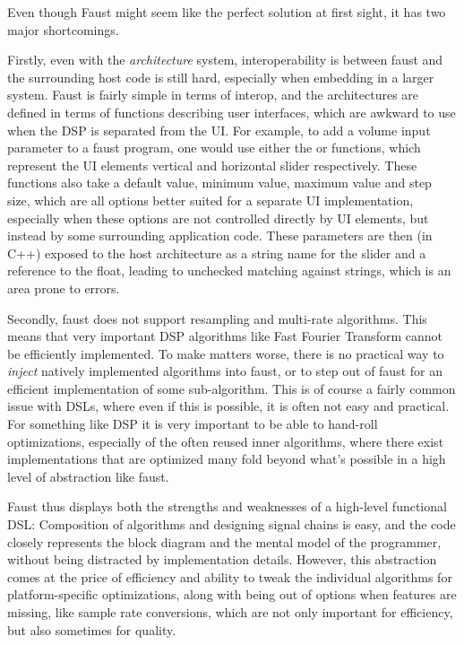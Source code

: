 Even though Faust might seem like the perfect solution at first sight, it has two major shortcomings.

Firstly, even with the \emph{architecture} system, interoperability is between faust and the surrounding
host code is still hard, especially when embedding in a larger system. Faust is fairly simple in terms of
interop, and the architectures are defined in terms of functions describing user interfaces, which are
awkward to use when the DSP is separated from the UI. For example, to add a volume input parameter to a faust
program, one would use either the  or  functions, which represent the UI elements
vertical and horizontal slider respectively. These functions also take a default value, minimum value,
maximum value and step size, which are all options better suited for a separate UI implementation, especially
when these options are not controlled directly by UI elements, but instead by some surrounding application
code. These parameters are then (in C++) exposed to the host architecture as a string name for the slider and
a reference to the float, leading to unchecked matching against strings, which is an area prone to errors.

Secondly, faust does not support resampling and multi-rate algorithms. This means that very important DSP
algorithms like Fast Fourier Transform cannot be efficiently implemented. To make matters worse, there is no
practical way to \emph{inject} natively implemented algorithms into faust, or to step out of faust
for an efficient implementation of some sub-algorithm. This is of course a fairly common issue with DSLs,
where even if this is possible, it is often not easy and practical. For something like DSP it is very
important to be able to hand-roll optimizations, especially of the often reused inner algorithms, where there
exist implementations that are optimized many fold beyond what's possible in a high level of abstraction like
faust.

Faust thus displays both the strengths and weaknesses of a high-level functional DSL: Composition of
algorithms and designing signal chains is easy, and the code closely represents the block diagram and the
mental model of the programmer, without being distracted by implementation details. However, this abstraction
comes at the price of efficiency and ability to tweak the individual algorithms for platform-specific
optimizations, along with being out of options when features are missing, like sample rate conversions, which
are not only important for efficiency, but also sometimes for quality.

